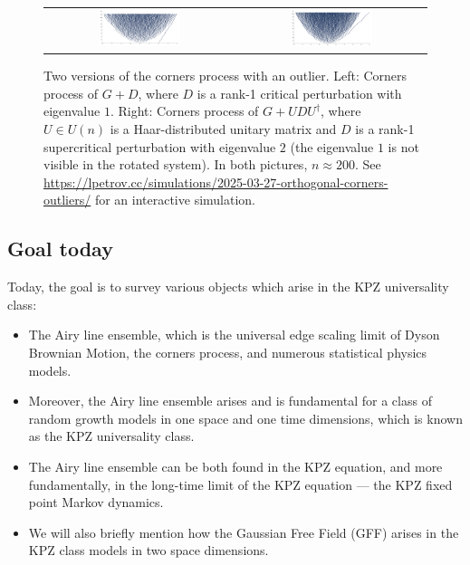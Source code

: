 \documentclass[letterpaper,11pt,oneside,reqno]{article}
\numberwithin{equation}{section}
\theoremstyle{definition}
\begin{document}
\begin{figure}[]
	\centering
	\begin{tabular}{cc}
		\includegraphics[width=0.45\textwidth]{pictures/outlier.png} &
		\includegraphics[width=0.45\textwidth]{pictures/rotated_outlier.png}
	\end{tabular}
	\caption{Two versions of the corners process with an outlier.
	Left: Corners process of $G+D$, where $D$ is a rank-1 critical perturbation with eigenvalue
	$1$. Right: Corners process of $G+UDU^\dagger$, where
	$U\in U(n)$ is a Haar-distributed unitary matrix and $D$
	is a rank-1 supercritical perturbation with eigenvalue $2$
	(the eigenvalue $1$ is not visible in the rotated system).
	In both pictures, $n\approx 200$. See
	\url{https://lpetrov.cc/simulations/2025-03-27-orthogonal-corners-outliers/}
	for an interactive simulation.}
	\label{fig:outlier-evolution}
\end{figure}


\subsection{Goal today}

Today, the goal is to survey various objects which arise in the KPZ universality class:
\begin{itemize}
	\item
		The Airy line ensemble, which is
		the universal edge scaling limit of Dyson Brownian Motion,
		the corners process, and numerous statistical physics models.
	\item
		Moreover, the Airy line ensemble arises and
		is fundamental for a class of random growth models
		in one space and one time dimensions, which is known as the KPZ universality class.
	\item
		The Airy line ensemble can be both found in the KPZ equation, and
		more fundamentally, in the long-time limit of the KPZ equation --- the
		KPZ fixed point Markov dynamics.
	\item We will also briefly mention how the Gaussian Free Field (GFF) arises in the KPZ class
		models in two space dimensions.
\end{itemize}
\end{document}
